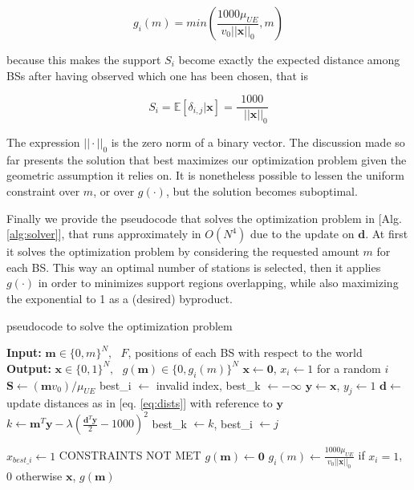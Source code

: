\documentclass[conference,10pt]{IEEEtran}
\begin{document}
\begin{equation}
g_i(m) = min\left(\frac{1000\mu_{U\!E}}{v_0 ||\mathbf{x}||_0}, m\right)
\end{equation} 

because this makes the support $S_i$ become exactly the expected distance among BSs after having observed which one has been chosen, that is

\begin{equation}
S_i = \mathbb{E}{[\delta_{i, j}| \mathbf{x}]} =  \frac{1000}{\textrm{ }||\mathbf{x}||_0}
\end{equation} 

The expression $||\cdot||_0$ is the zero norm of a binary vector. The discussion made so far presents the solution that best maximizes our optimization problem given the geometric assumption it relies on. It is nonetheless possible to lessen the uniform constraint over $m$, or over $g(\cdot)$, but the solution becomes suboptimal. 

Finally we provide the pseudocode that solves the optimization problem in [Alg. \ref{alg:solver}], that runs approximately in $O(N^4)$ due to the update on $\mathbf{d}$. At first it solves the optimization problem by considering the requested amount $m$ for each BS. This way an optimal number of stations is selected, then it applies $g(\cdot)$ in order to minimizes support regions overlapping, while also maximizing the exponential to 1 as a (desired) byproduct.

\begin{algorithm}
	\caption{pseudocode to solve the optimization problem}
	\label{alg:solver}
	\begin{algorithmic}
		\STATE \textbf{Input:} $\mathbf{m} \in \{0, m\}^N, \textrm{ } F$, positions of each BS with respect to the world
		\STATE \textbf{Output:} $\mathbf{x} \in \{0, 1\}^N, \textrm{ } g(\mathbf{m}) \in \{0, g_i(m)\}^N$
		\STATE \null
			\STATE $\mathbf{x} \leftarrow \mathbf{0}$, $x_i \leftarrow 1$ for a random $i$
			\STATE $\mathbf{S} \leftarrow (\mathbf{m}v_0)/\mu_{U\!E}$
				\STATE best_i $\leftarrow$ invalid index, best_k $\leftarrow -\infty$ 
					\STATE $\mathbf{y} \leftarrow \mathbf{x}$, $y_j \leftarrow 1$
					\STATE $\mathbf{d} \leftarrow$ update distances as in [eq. \ref{eq:dists}] with reference to    	$\mathbf{y}$
					\STATE $k \leftarrow \mathbf{m}^T\mathbf{y} - \lambda\left(\frac{\mathbf{d}^T\mathbf{y}}{2} - 1000\right)^2$
						\STATE best_k $\leftarrow k$, best_i  $\leftarrow j$
					\ENDIF
				\ENDFOR 
				
					\STATE $x_{best\_i} \leftarrow 1$
				\ELSE
					\STATE CONSTRAINTS NOT MET
				\ENDIF
			\ENDWHILE
			\STATE $g(\mathbf{m}) \leftarrow \mathbf{0}$
				\STATE 	$g_i(m)\leftarrow \frac{1000\mu_{U\!E}}{v_0||\mathbf{x}||_0}$ if $x_i=1$, 0 otherwise
 			\ENDFOR
			\RETURN $\mathbf{x}$, $g(\mathbf{m})$
	\end{algorithmic}
\end{algorithm}
\end{document}

